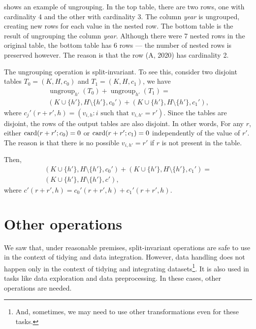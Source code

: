  shows an example of ungrouping.  In the top table, there are two rows,
one with cardinality 4 and the other with cardinality 3.  The column \emph{year} is
ungrouped, creating new rows for each value in the nested row.  The bottom table is the
result of ungrouping the column \emph{year}.  Although there were 7 nested rows in the
original table, the bottom table has 6 rows --- the number of nested rows is preserved
however.  The reason is that the row (A, 2020) has cardinality 2.

The ungrouping operation is split-invariant.  To see this, consider two disjoint tables
$T_0 = (K, H, c_0)$ and $T_1 = (K, H, c_1)$, we have
\begin{multline*}
  \operatorname{ungroup}_{h'}(T_0) + \operatorname{ungroup}_{h'}(T_1) = \\
    \left(K \cup \{h'\}, H \setminus \{h'\}, c_0'\right) +
    \left(K \cup \{h'\}, H \setminus \{h'\}, c_1'\right)\text{,}
\end{multline*}
where $c_j'(r + r', h) = (v_{i,h} : i \text{ such that } v_{i, h'} = r')$. Since the
tables are disjoint, the rows of the output tables are also disjoint.  In other words,
For any $r$, either $\rowcard[{r + r'; c_0}] = 0$ or $\rowcard[{r + r'; c_1}] = 0$
independently of the value of $r'$.  The reason is that there is no possible $v_{i,h'} =
r'$ if $r$ is not present in the table.

Then,
\begin{multline*}
  \left(K \cup \{h'\}, H \setminus \{h'\}, c_0'\right) +
  \left(K \cup \{h'\}, H \setminus \{h'\}, c_1'\right) = \\
    \left(K \cup \{h'\}, H \setminus \{h'\}, c'\right)\text{,}
\end{multline*}
where $c'(r + r', h) = c_0'(r + r', h) + c_1'(r + r', h)$.


\section{Other operations}

We saw that, under reasonable premises, split-invariant operations are safe to use in the
context of tidying and data integration.  However, data handling does not happen only in
the context of tidying and integrating datasets\footnote{And, sometimes, we may need to
use other transformations even for these tasks.}.  It is also used in tasks like data
exploration and data preprocessing.  In these cases, other operations are needed.


